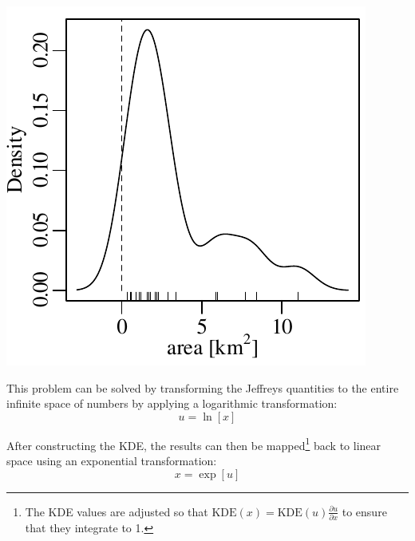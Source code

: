 \noindent\begin{minipage}[t][][b]{.3\textwidth}
  \includegraphics[width=\textwidth]{../figures/negativeKDE.pdf}\medskip
\end{minipage}
\begin{minipage}[t][][t]{.7\textwidth}
  \label{fig:negativeKDE}
\end{minipage}

This problem can be solved by transforming the Jeffreys quantities to
the entire infinite space of numbers by applying a logarithmic
transformation:
\begin{equation}
  u = \ln[x]
\end{equation}

After constructing the KDE, the results can then be
mapped\footnote{The KDE values are adjusted so that $\mbox{KDE}(x) =
\mbox{KDE}(u)\frac{\partial{u}}{\partial{x}}$ to ensure that they
integrate to 1.} back to linear space using an exponential
transformation:
\begin{equation}
  x = \exp[u]
\end{equation}

